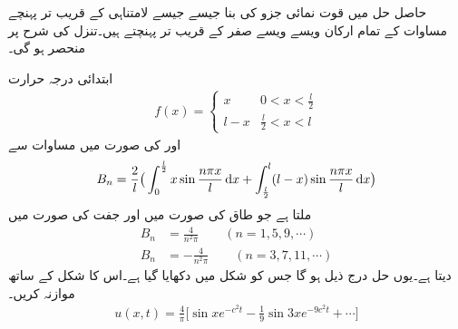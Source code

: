 حاصل حل میں قوت نمائی جزو کی بنا جیسے جیسے  لامتناہی کے قریب تر پہنچے مساوات  کے تمام ارکان ویسے ویسے صفر کے قریب تر پہنچتے ہیں۔تنزل کی شرح  پر منحصر ہو گی۔

ابتدائی درجہ حرارت 
\begin{align*}
f(x)=
\begin{cases}
x&0<x<\frac{l}{2}\\
l-x&\frac{l}{2}<x<l
\end{cases}
\end{align*}
اور  کی صورت میں مساوات  سے
\begin{align}
B_n=\frac{2}{l}\big(\int_0^{\frac{l}{2}}x\sin \frac{n\pi x}{l}\dif x+\int_{\frac{l}{2}}^{l} (l-x)\sin\frac{n\pi x}{l}\dif x\big)
\end{align}
ملتا ہے جو طاق  کی صورت میں  اور جفت  کی صورت میں
\begin{align*}
B_n&=\frac{4}{n^2\pi}\quad \quad (n=1,5,9,\cdots)\\
B_n&=-\frac{4}{n^2\pi}\quad \quad (n=3,7,11,\cdots)
\end{align*}
دیتا ہے۔یوں حل درج ذیل ہو گا جس کو شکل  میں دکھایا گیا ہے۔اس کا  شکل  کے ساتھ موازنہ کریں۔
\begin{align*}
u(x,t)=\frac{4}{\pi}\big[\sin x e^{-c^2t}-\frac{1}{9}\sin 3x e^{-9c^2t}+\cdots\big]
\end{align*}
%
